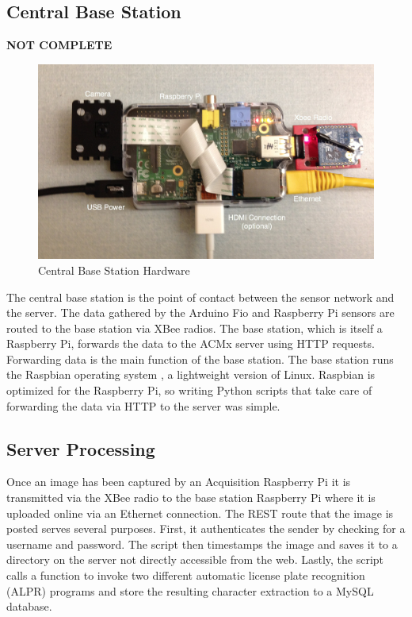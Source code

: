 \documentclass[11pt, oneside, fullpage, doublespace]{article}
\begin{document}
\subsection{Central Base Station}
{\color{red}\textbf{NOT COMPLETE}}
\begin{figure}
\begin{center}
\includegraphics[width=4.5in]{basestation}
\end{center}
\caption{Central Base Station Hardware}
\label{fig:basestation}
\end{figure}

The central base station is the point of contact between the sensor network and the server. The data gathered by the Arduino Fio and Raspberry Pi sensors are routed to the base station via XBee radios. The base station, which is itself a Raspberry Pi, forwards the data to the ACMx server using HTTP requests. Forwarding data is the main function of the base station. The base station runs the Raspbian operating system \cite{raspbian}, a lightweight version of Linux. Raspbian is optimized for the Raspberry Pi, so writing Python scripts that take care of forwarding the data via HTTP to the server was simple.

\subsection{Server Processing}
Once an image has been captured by an Acquisition Raspberry Pi it is transmitted via the XBee radio to the base station Raspberry Pi where it is uploaded online via an Ethernet connection. The REST route that the image is posted serves several purposes. First, it authenticates the sender by checking for a username and password. The script then timestamps the image and saves it to a directory on the server not directly accessible from the web. Lastly, the script calls a function to invoke two different automatic license plate recognition (ALPR) programs and store the resulting character extraction to a MySQL database.
\end{document}
